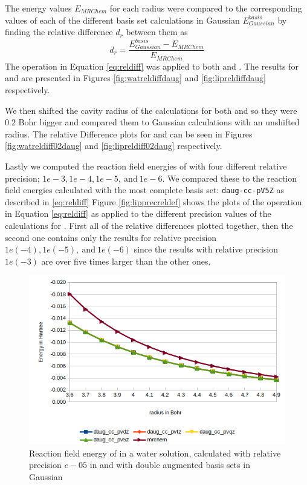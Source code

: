 \documentclass[../Thesis.tex]{subfiles}
\begin{document}
The \mrchem energy values $E_{MRChem}$ for each radius were compared to the
corresponding values of each of the different basis set calculations in
Gaussian  $E_{Gaussian}^{basis}$ by finding the relative difference $d_r$
between them as
\begin{equation}\label{eq:reldiff}
  d_r = \frac{E_{Gaussian}^{basis} - E_{MRChem}}{E_{MRChem}}
\end{equation}
The operation in Equation \ref{eq:reldiff} was applied to both  and .
The results for  and  are presented in Figures \ref{fig:watreldiffdaug}
and \ref{fig:lipreldiffdaug} respectively.

We then shifted the cavity radius of the \mrchem calculations for both  and
 so they were $0.2$ Bohr bigger and compared them to Gaussian calculations
with an unshifted radius. The relative Difference plots for  and  can be seen
in Figures \ref{fig:watreldiff02daug} and \ref{fig:lipreldiff02daug} respectively.

Lastly we computed the reaction field energies of  with four different
relative precision; $1e-3, 1e-4, 1e-5,\  \text{and}\  1e-6$. We compared these
to the reaction field energies calculated with the most complete basis set:
\verb!daug-cc-pV5Z! as described in \ref{eq:reldiff}
Figure \ref{fig:lipprecreldef} shows the plots of the operation in Equation \ref{eq:reldiff}
 as applied to the different precision values of the \mrchem calculations for .
First all of the relative differences plotted together, then the second one contains
only the results for relative precision $1e(-4), 1e(-5),\  \text{and}\  1e(-6)$ since
the results with relative precision $1e(-3)$ are over five times larger than the other ones.

\begin{figure}[!htb]
  \centering
    \includegraphics[width=0.75\linewidth]{img/Erdaugwat.png}
  \caption[Reaction field energy of ]{Reaction field energy of  in a water solution, calculated with relative precision $e-05$ in \mrchem and with double augmented basis sets in Gaussian}
  \label{fig:watEnergyplotsdaug}
\end{figure}
\end{document}
